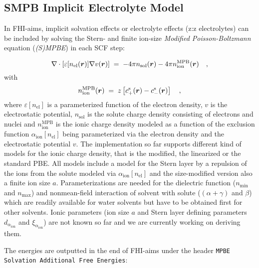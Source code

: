 \subsection{SMPB Implicit Electrolyte Model}
\label{Sec:ModifiedPoissonBoltzmann}

In FHI-aims, implicit solvation effects or electrolyte effects (z:z electrolytes) can be included by solving the Stern- and finite ion-size \emph{Modified Poisson-Boltzmann} equation (\emph{(S)MPBE}) in each SCF step:

\begin{equation}
\nabla \cdot \left[\varepsilon[n_{\rm el}(\bm{r})]\nabla v(\bm{r})\right] \;=\; -4\pi n_{\rm sol}(\bm{r}) - 4\pi n_\mathrm{ion}^\mathrm{MPB}(\bm{r}) \quad ,
\label{eq:PBE}
\end{equation}
with
\begin{equation}
n_\mathrm{ion}^\mathrm{MPB}(\bm{r}) \;=\; z \left[ c^{\rm s}_+(\bm{r}) - c^{\rm s}_-(\bm{r}) \right] \quad ,
\label{eq:PBE_fv}
\end{equation}
where
$\varepsilon[n_\mathrm{el}]$ is a parameterized function of the electron density, $v$ is the electrostatic potential, $n_\mathrm{sol}$ is the solute charge density consisting of electrons and nuclei and $n_\mathrm{ion}^\mathrm{MPB}$ is the ionic charge density modeled as a function of the exclusion function $\alpha_\mathrm{ion}[n_\mathrm{el}]$ being parameterized via the electron density and the electrostatic potential $v$. The implementation so far supports different kind of models for the ionic charge density, that is the modified, the linearized or the standard PBE. All models include a model for the Stern layer by a repulsion of the ions from the solute modeled via $\alpha_\mathrm{ion}[n_\mathrm{el}]$ and the size-modified version also a finite ion size $a$. Parameterizations are needed for the dielectric function ($n_\mathrm{min}$ and $n_\mathrm{max}$) and nonmean-field interaction of solvent with solute ($(\alpha+\gamma)$ and $\beta$) which are readily available for water solvents but have to be obtained first for other solvents. Ionic parameters (ion size $a$ and Stern layer defining parameters $d_{\alpha_\mathrm{ion}}$ and $\xi_{\alpha_\mathrm{ion}}$) are not known so far and we are currently working on deriving them.

The energies are outputted in the end of FHI-aims under the header \texttt{MPBE Solvation Additional Free Energies}:


